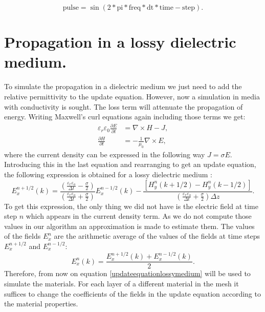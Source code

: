 \documentclass[12pt, oneside]{book}
\begin{document}
\begin{equation}
\text{pulse} = \sin(2*\text{pi}*\text{freq}*\text{dt}*\text{time}-\text{step}).
\end{equation}


\section{Propagation in a lossy dielectric medium.}
To simulate the propagation in a dielectric medium we just need to add the relative permittivity to the update equation. However, now a simulation in media with conductivity is sought. The loss term will attenuate the propagation of energy. Writing Maxwell's curl equations again including those terms we get:
\begin{equation}\label{maxwelllossymedium}
\begin{aligned}
\varepsilon_{r} \varepsilon_{0} \frac{\partial E}{\partial t} &=\nabla \times H-J, \\
\frac{\partial H}{\partial t} &=-\frac{1}{\mu_{0}} \nabla \times E,
\end{aligned}
\end{equation}
where the current density can be expressed in the following way $J=\sigma E$. Introducing this in the last equation and rearranging to get an update equation, the following expression is obtained for a lossy dielectric medium \cite{taflove2005computational}:
\begin{equation}\label{updateequationlossymedium}
E_{x}^{n+1/2}(k)  = \frac{\left(\frac{\varepsilon_{r} \varepsilon_{o}}{\Delta t}-\frac{\sigma}{2}\right)}{\left(\frac{\varepsilon_{r} \varepsilon_{o}}{\Delta t}+\frac{\sigma}{2}\right)} E_{x}^{n-1/2}(k) 
- \frac{\left[H_{y}^{n}(k+1 / 2)-H_{y}^{n}(k-1 / 2)\right]}{\left(\frac{\varepsilon_{r} \varepsilon_{o}}{\Delta t}+\frac{\sigma}{2}\right) \Delta z} .
\end{equation}
To get this expression, the only thing we did not have is the electric field at time step $n$ which appears in the current density term. As we do not compute those values in our algorithm an approximation is made to estimate them. The values of the fields $E_x^n$ are the arithmetic average of the values of the fields at time steps $E_x^{n+1/2}$ and $E_x^{n-1/2}$:
\begin{equation}
E_x^n(k)=\frac{E_x^{n+1/2}(k)+E_x^{n-1/2}(k)}{2}.
\end{equation}
\indent Therefore, from now on equation \ref{updateequationlossymedium} will be used to simulate the materials. For each layer of a different material in the mesh it suffices to change the coefficients of the fields in  the update equation according to the material properties.
\end{document}
